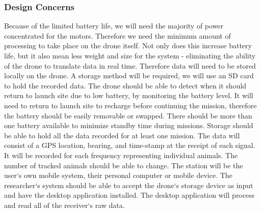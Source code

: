 \documentclass[onecolumn, draftclsnofoot,10pt, compsoc]{IEEEtran}
\begin{document}
\subsubsection{Design Concerns}
Because of the limited battery life, we will need the majority of power concentrated for the motors. Therefore we need the minimum amount of processing to take place on the drone itself. Not only does this increase battery life, but it also mean less weight and size for the system - eliminating the ability of the drone to translate data in real time. Therefore data will need to be stored locally on the drone. A storage method will be required, we will use an SD card to hold the recorded data.
\newline
\newline
The drone should be able to detect when it should return to launch site due to low battery, by monitoring the battery level.
It will need to return to launch site to recharge before continuing the mission, therefore the battery should be easily removable or swapped.
There should be more than one battery available to minimize standby time during missions.
\newline
\newline
Storage should be able to hold all the data recorded for at least one mission.
The data will consist of a GPS location, bearing, and time-stamp at the receipt of each signal. It will be recorded for each frequency representing individual animals. The number of tracked animals should be able to change.
\newline
\newline
The station will be the user`s own mobile system, their personal computer or mobile device. The researcher`s system should be able to accept the drone`s storage device as input and have the desktop application installed.
The desktop application will process and read all of the receiver`s raw data.  
\end{document}
